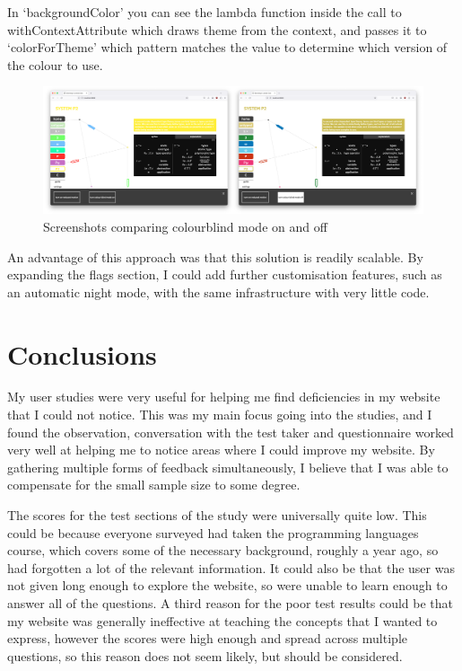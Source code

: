 \documentclass{l4proj}
\begin{document}
In `backgroundColor' you can see the lambda function inside the call to withContextAttribute which draws theme from the context, and passes it to `colorForTheme' which pattern matches the value to determine which version of the colour to use.

\begin{figure}[h!]
    \centering
    \includegraphics[width=1\linewidth]{dissertation/images/colourbind_collage.png}
    \caption{Screenshots comparing colourblind mode on and off}
    \label{fig:enter-label}
\end{figure}    

An advantage of this approach was that this solution is readily scalable.  By expanding the flags section, I could add further customisation features, such as an automatic night mode, with the same infrastructure with very little code.

\section{Conclusions}

My user studies were very useful for helping me find deficiencies in my website that I could not notice.  This was my main focus going into the studies, and I found the observation, conversation with the test taker and questionnaire worked very well at helping me to notice areas where I could improve my website.  By gathering multiple forms of feedback simultaneously, I believe that I was able to compensate for the small sample size to some degree.

The scores for the test sections of the study were universally quite low.  This could be because everyone surveyed had taken the programming languages course, which covers some of the necessary background, roughly a year ago, so had forgotten a lot of the relevant information.  It could also be that the user was not given long enough to explore the website, so were unable to learn enough to answer all of the questions.  A third reason for the poor test results could be that my website was generally ineffective at teaching the concepts that I wanted to express, however the scores were high enough and spread across multiple questions, so this reason does not seem likely, but should be considered.
\end{document}
